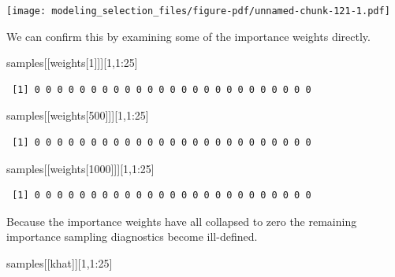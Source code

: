 \documentclass[
  letterpaper,
  DIV=11,
  numbers=noendperiod]{scrartcl}
\newenvironment{Shaded}{\begin{snugshade}}{\end{snugshade}}
\newcommand{\DecValTok}[1]{\textcolor[rgb]{0.68,0.00,0.00}{#1}}
\newcommand{\NormalTok}[1]{\textcolor[rgb]{0.00,0.23,0.31}{#1}}
\newcommand{\SpecialCharTok}[1]{\textcolor[rgb]{0.37,0.37,0.37}{#1}}
\newcommand{\StringTok}[1]{\textcolor[rgb]{0.13,0.47,0.30}{#1}}
\begin{document}
\texttt{[image: modeling\_selection\_files/figure-pdf/unnamed-chunk-121-1.pdf]}

We can confirm this by examining some of the importance weights
directly.

\begin{Shaded}
\begin{Highlighting}[]
\NormalTok{samples[[}\StringTok{\textquotesingle{}weights[1]\textquotesingle{}}\NormalTok{]][}\DecValTok{1}\NormalTok{,}\DecValTok{1}\SpecialCharTok{:}\DecValTok{25}\NormalTok{]}
\end{Highlighting}
\end{Shaded}

\begin{verbatim}
 [1] 0 0 0 0 0 0 0 0 0 0 0 0 0 0 0 0 0 0 0 0 0 0 0 0 0
\end{verbatim}

\begin{Shaded}
\begin{Highlighting}[]
\NormalTok{samples[[}\StringTok{\textquotesingle{}weights[500]\textquotesingle{}}\NormalTok{]][}\DecValTok{1}\NormalTok{,}\DecValTok{1}\SpecialCharTok{:}\DecValTok{25}\NormalTok{]}
\end{Highlighting}
\end{Shaded}

\begin{verbatim}
 [1] 0 0 0 0 0 0 0 0 0 0 0 0 0 0 0 0 0 0 0 0 0 0 0 0 0
\end{verbatim}

\begin{Shaded}
\begin{Highlighting}[]
\NormalTok{samples[[}\StringTok{\textquotesingle{}weights[1000]\textquotesingle{}}\NormalTok{]][}\DecValTok{1}\NormalTok{,}\DecValTok{1}\SpecialCharTok{:}\DecValTok{25}\NormalTok{]}
\end{Highlighting}
\end{Shaded}

\begin{verbatim}
 [1] 0 0 0 0 0 0 0 0 0 0 0 0 0 0 0 0 0 0 0 0 0 0 0 0 0
\end{verbatim}

Because the importance weights have all collapsed to zero the remaining
importance sampling diagnostics become ill-defined.

\begin{Shaded}
\begin{Highlighting}[]
\NormalTok{samples[[}\StringTok{\textquotesingle{}khat\textquotesingle{}}\NormalTok{]][}\DecValTok{1}\NormalTok{,}\DecValTok{1}\SpecialCharTok{:}\DecValTok{25}\NormalTok{]}
\end{Highlighting}
\end{Shaded}
\end{document}
